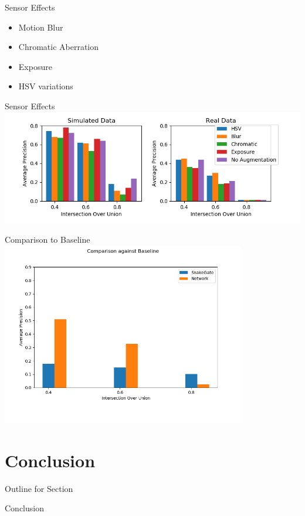 \documentclass{beamer}
\begin{document}
\begin{darkframes}
    \begin{frame}{Sensor Effects}
\begin{itemize}
	\item Motion Blur 
	\item Chromatic Aberration
	\item Exposure
	\item HSV variations
\end{itemize}
\end{frame}
    \begin{frame}{Sensor Effects}
    \includegraphics[width=\textwidth]{../../thesis/fig/pp_bar}
	\end{frame}


      \begin{frame}{Comparison to Baseline}
      \centering
    \includegraphics[width=0.8\textwidth]{../../thesis/fig/comp_baseline}
	\end{frame}

    
    \section{Conclusion}
            \begin{frame}{Outline for Section \thesection}
    \tableofcontents[currentsection]
\end{frame}
    \begin{frame}{Conclusion}


\end{frame}
\end{darkframes}
\end{document}
